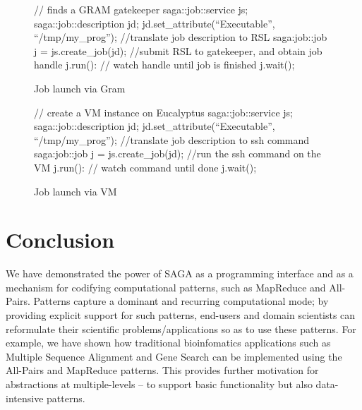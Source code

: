 \documentclass[conference,final]{IEEEtran}
\begin{document}

\begin{figure}[!ht]
 \begin{center}
  \begin{mycode}[label=SAGA Job Launch via GRAM gatekeeper]
   {// finds a GRAM gatekeeper
    saga::job::service js;
    saga::job::description jd;
    jd.set_attribute(``Executable'', ``/tmp/my_prog'');
    //translate job description to RSL
    saga:job::job j = js.create_job(jd);
    //submit RSL to gatekeeper, and obtain job handle
    j.run():
    // watch handle until job is finished
    j.wait();
   } 
  \end{mycode}
  \caption{\label{gramjob}Job launch via Gram }
 \end{center}
\end{figure}


\begin{figure}[!ht]
 \begin{center}
  \begin{mycode}[label=SAGA create a VM instance on Eucalyptus]
   {// create a VM instance on Eucalyptus
    saga::job::service js;
    saga::job::description jd;
    jd.set_attribute(``Executable'', ``/tmp/my_prog'');
    //translate job description to ssh command
    saga:job::job j = js.create_job(jd);
    //run the ssh command on the VM
    j.run():
    // watch command until done
    j.wait();
   } 
  \end{mycode}
  \caption{\label{vmjob} Job launch via VM}
 \end{center}
\end{figure}


\section{Conclusion}

We have demonstrated the power of SAGA as a programming interface and
as a mechanism for codifying computational patterns, such as MapReduce
and All-Pairs.  Patterns capture a dominant and recurring
computational mode; by providing explicit support for such patterns,
end-users and domain scientists can reformulate their scientific
problems/applications so as to use these patterns. For example, we
have shown how traditional bioinfomatics applications such as Multiple
Sequence Alignment and Gene Search can be implemented using the
All-Pairs and MapReduce patterns. This provides further motivation for
abstractions at multiple-levels -- to support basic functionality but
also data-intensive patterns.
\end{document}
